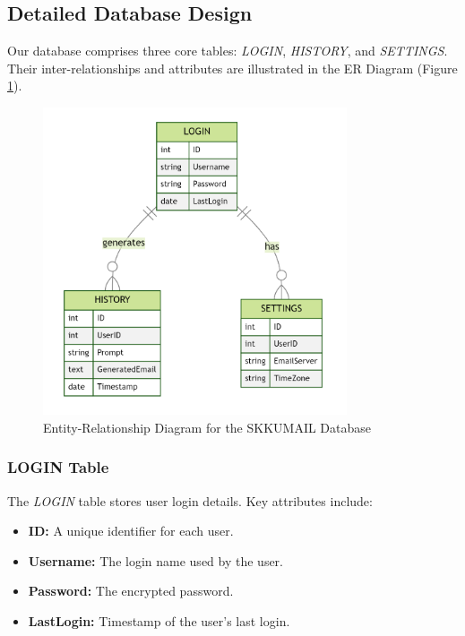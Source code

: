 \documentclass[12pt]{article}
\begin{document}
\subsection{Detailed Database Design}

Our database comprises three core tables: \textit{LOGIN}, \textit{HISTORY}, and \textit{SETTINGS}. Their inter-relationships and attributes are illustrated in the ER Diagram (Figure \ref{fig:er_diagram}). 

\begin{figure}[ht]
	\centering
	\includegraphics[width=0.8\textwidth]{ER_Diagram.png}
	\caption{Entity-Relationship Diagram for the SKKUMAIL Database}
	\label{fig:er_diagram}
\end{figure}

\subsubsection{LOGIN Table}
The \textit{LOGIN} table stores user login details. Key attributes include:
\begin{itemize}
	\item \textbf{ID:} A unique identifier for each user.
	\item \textbf{Username:} The login name used by the user.
	\item \textbf{Password:} The encrypted password.
	\item \textbf{LastLogin:} Timestamp of the user's last login.
\end{itemize}
\end{document}
